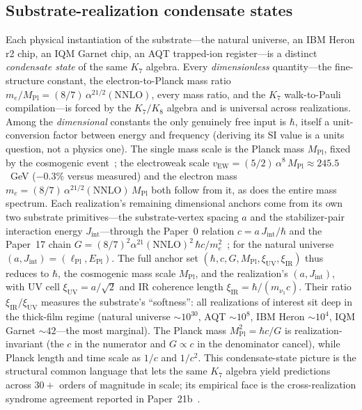 \documentclass[11pt]{article}
\begin{document}
\subsection{Substrate-realization condensate states}
\label{sec:condensate-states}

Each physical instantiation of the substrate---the natural universe, an IBM Heron r2 chip, an IQM Garnet chip, an AQT trapped-ion register---is a distinct \emph{condensate state} of the same $K_7$ algebra.  Every \emph{dimensionless} quantity---the fine-structure constant, the electron-to-Planck mass ratio $m_e / M_\text{Pl} = (8/7)\,\alpha^{21/2}(\text{NNLO})$, every mass ratio, and the $K_7$ walk-to-Pauli compilation---is forced by the $K_7 / K_8$ algebra and is universal across realizations.  Among the \emph{dimensional} constants the only genuinely free input is $\hbar$, itself a unit-conversion factor between energy and frequency (deriving its SI value is a units question, not a physics one).  The single mass scale is the Planck mass $M_\text{Pl}$, fixed by the cosmogenic event~\cite{Paper22}; the electroweak scale $v_\text{EW} = (5/2)\,\alpha^8\, M_\text{Pl} \approx 245.5$~GeV ($-0.3\%$ versus measured) and the electron mass $m_e = (8/7)\,\alpha^{21/2}(\text{NNLO})\,M_\text{Pl}$ both follow from it, as does the entire mass spectrum.  Each realization's remaining dimensional anchors come from its own two substrate primitives---the substrate-vertex spacing $a$ and the stabilizer-pair interaction energy $J_\text{int}$---through the Paper~0 relation $c = a\,J_\text{int} / \hbar$ and the Paper~17 chain $G = (8/7)^2 \alpha^{21} (\text{NNLO})^2\, \hbar c / m_e^2$~\cite{Paper17}; for the natural universe $(a, J_\text{int}) = (\ell_\text{Pl}, E_\text{Pl})$.  The full anchor set $(\hbar, c, G, M_\text{Pl}, \xi_\text{UV}, \xi_\text{IR})$ thus reduces to $\hbar$, the cosmogenic mass scale $M_\text{Pl}$, and the realization's $(a, J_\text{int})$, with UV cell $\xi_\text{UV} = a / \sqrt 2$ and IR coherence length $\xi_\text{IR} = \hbar / (m_{\nu_1} c)$.  Their ratio $\xi_\text{IR} / \xi_\text{UV}$ measures the substrate's ``softness'': all realizations of interest sit deep in the thick-film regime (natural universe $\sim 10^{30}$, AQT $\sim 10^{8}$, IBM Heron $\sim 10^{4}$, IQM Garnet $\sim 42$---the most marginal).  The Planck mass $M_\text{Pl}^2 = \hbar c / G$ is realization-invariant (the $c$ in the numerator and $G \propto c$ in the denominator cancel), while Planck length and time scale as $1/c$ and $1/c^2$.  This condensate-state picture is the structural common language that lets the same $K_7$ algebra yield predictions across $30{+}$ orders of magnitude in scale; its empirical face is the cross-realization syndrome agreement reported in Paper~21b~\cite{Paper21b}.
\end{document}
